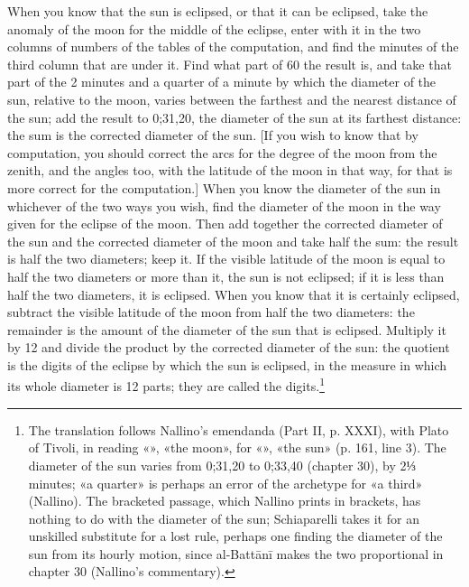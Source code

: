 \documentclass[11pt]{article}
\begin{document}
\par When you know that the sun is eclipsed, or that it can be eclipsed, take the anomaly of the moon for the middle of the eclipse, enter with it in the two columns of numbers of the tables of the computation, and find the minutes of the third column that are under it. Find what part of 60 the result is, and take that part of the 2 minutes and a quarter of a minute by which the diameter of the sun, relative to the moon, varies between the farthest and the nearest distance of the sun; add the result to 0;31,20, the diameter of the sun at its farthest distance: the sum is the corrected diameter of the sun. [If you wish to know that by computation, you should correct the arcs for the degree of the moon from the zenith, and the angles too, with the latitude of the moon in that way, for that is more correct for the computation.] When you know the diameter of the sun in whichever of the two ways you wish, find the diameter of the moon in the way given for the eclipse of the moon. Then add together the corrected diameter of the sun and the corrected diameter of the moon and take half the sum: the result is half the two diameters; keep it. If the visible latitude of the moon is equal to half the two diameters or more than it, the sun is not eclipsed; if it is less than half the two diameters, it is eclipsed. When you know that it is certainly eclipsed, subtract the visible latitude of the moon from half the two diameters: the remainder is the amount of the diameter of the sun that is eclipsed. Multiply it by 12 and divide the product by the corrected diameter of the sun: the quotient is the digits of the eclipse by which the sun is eclipsed, in the measure in which its whole diameter is 12 parts; they are called the digits.\footnote{The translation follows Nallino's emendanda (Part II, p. XXXI), with Plato of Tivoli, in reading «», «the moon», for «», «the sun» (p. 161, line 3). The diameter of the sun varies from 0;31,20 to 0;33,40 (chapter 30), by 2⅓ minutes; «a quarter» is perhaps an error of the archetype for «a third» (Nallino). The bracketed passage, which Nallino prints in brackets, has nothing to do with the diameter of the sun; Schiaparelli takes it for an unskilled substitute for a lost rule, perhaps one finding the diameter of the sun from its hourly motion, since al-Battānī makes the two proportional in chapter 30 (Nallino's commentary).}\par
\end{document}
